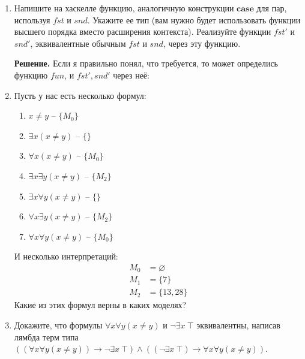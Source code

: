\begin{enumerate}
\item Напишите на хаскелле функцию, аналогичную конструкции $\mathbf{case}$ для пар, используя $fst$ и $snd$.
    Укажите ее тип (вам нужно будет использовать функции высшего порядка вместо расширения контекста).
    Реализуйте функции $fst'$ и $snd'$, эквивалентные обычным $fst$ и $snd$, через эту функцию.

\textbf{Решение.} Если я правильно понял, что требуется, то может определись функцию $fun$, и $fst', snd'$ через неё:



\item Пусть у нас есть несколько формул:
\begin{enumerate}
\item \label{it:no} $x \neq y$ -- $\{M_0\}$
\item \label{it:e} $\exists x (x \neq y)$ -- $\{\}$
\item \label{it:a} $\forall x (x \neq y)$ -- $\{M_0\}$
\item \label{it:ee} $\exists x \exists y (x \neq y)$ -- $\{M_2\}$
\item \label{it:ea} $\exists x \forall y (x \neq y)$ -- $\{\}$
\item \label{it:ae} $\forall x \exists y (x \neq y)$ -- $\{M_2\}$
\item \label{it:aa} $\forall x \forall y (x \neq y)$ -- $\{M_0\}$
\end{enumerate}
И несколько интерпретаций:
\begin{align*}
M_0 & = \varnothing \\
M_1 & = \{ 7 \} \\
M_2 & = \{ 13, 28 \}
\end{align*}
Какие из этих формул верны в каких моделях?

\item Докажите, что формулы $\forall x \forall y (x \neq y)$ и $\neg \exists x\ \top$ эквивалентны,
    написав лямбда терм типа $((\forall x \forall y (x \neq y)) \to \neg \exists x\ \top) \land ((\neg \exists x\ 
    \top) \to \forall x \forall y (x \neq y))$.


\end{enumerate}
